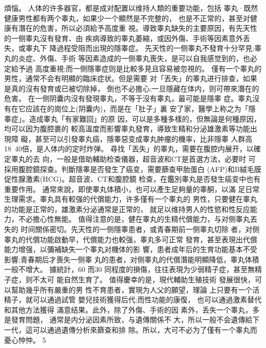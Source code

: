 \documentclass[12pt,UTF8]{ctexbook}
\begin{document}
煩惱。
人体的许多器官，都是成对配置以维持人類的重要功能，包括
睾丸·既然健康男性都有两个睾丸，如果少一个顯然是不完整的，
也是不正常的，甚至对健康有潛在的危害，所以必須給予高度重
視。導致睾丸缺失的主要原因，有先天性的一侧睾丸沒有發育、由
疾病導致的睾丸萎縮，或因外傷、手術等因素意外丢失，或睾丸下
降過程受阻而出現的隱睾症。
先天性的一侧睾丸不發育十分罕見;睾丸的炎症、外傷、手術
等因素造成的一侧睾丸喪失，是可以自我感觉到的，也必定給予過
高度重視;而一侧隱睾症则是比較多見且容易被忽視的。
僅有一个睾丸的男性，通常不会有明顯的臨床症状。但是需要
对「丟失」的睾丸进行排查，如果是真的沒有發育或已被切除掉，
倒也不必擔心;一旦隱藏在体内，则可帶來潛在的危害。
在一侧阴囊内沒有發現睾丸，不等于沒有睾丸，最可能是隱睾
症。睾丸沒有在它应該在的崗位上(阴囊内)，而是在「肚子」裏
安了家，醫學上称之为「隱睾症」。造成睾丸「有家難回」的原
因，可以是多種多樣的，但無論是何種原因，均可以因为腹腔裹的
較高溫度而影響睾丸發育，導致生精和分泌雄激素等功能出現障
礙，甚至可以引發睾丸癌，隱睾惡变成睾丸肿瘤的機率，比非隱睾
人群高18~40倍，是人体内的定时炸弹。
尋找「丟失」的睾丸，需要在腹腔内展开，以確定睾丸的去
向，一般是借助輔助检查儀器，超音波和CT是首選方法，必要时
可採用腹腔鏡探查。判斷隱睾是否發生了癌变，需要篩查甲胎蛋白
(AFP)和B絨毛膜促性腺激素(HCG)。超音波、CT和腹腔鏡
检查，在鑑別睾丸是否發生癌变中也有重要作用。
通常來說，即使睾丸体積小，也可以產生足夠量的睾酮，以滿
足日常生理需求。睾丸具有較强的代償能力，许多僅有一个睾丸的
男性，只要健在睾丸的功能是正常的，雄激素分泌通常是正常的，
就足以维持男人的性慾和性反应能力，不必擔心性無能。
值得注意的是，健在睾丸的生精代償能力，与对侧睾丸丟失的
时间關係密切。先天性的一侧隱睾患者，或青春期前一侧睾丸切除
者，对侧睾丸的代償功能啟動早，代償能力也較强，睾丸多可正常
發育，甚至表現出代償能力增强，以彌補缺失一个睾丸对機体的影
響，患者成年后的生育功能基本不受影響;青春期后才喪失一侧睾
丸的患者，对侧睾丸的代償潛能明顯降低，睾丸体積一般不增大。
據統計，60%
而30%
同程度的損傷，往往表現为少弱精子症，甚至無精子症，则不太可
能自然生育了。
值得慶幸的是，現代輔助生殖技術
發展很快，可以幫助幾乎所有嚴重的男
性不育患者，實現为人父的願望，理論
上只要有一个活精子，就可以通過試管
嬰兒技術獲得后代;而性功能的康復，
也可以通過激素替代和其他方法獲得
滿意结果。此外，除了外傷、手術的因
素外，丢失一个睾丸，多是發育問題，
通常是内分泌因素所致，与遺傳關係不
大，所以一般不会遺傳給下一代，這可以通過遺傳分析來篩查和排
除。所以，大可不必为了僅有一个睾丸而憂心忡忡。
5
\end{document}
